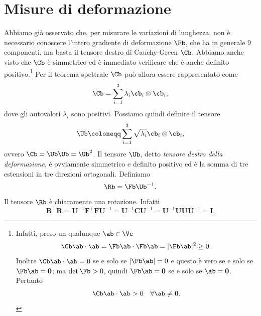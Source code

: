 \section{Misure di deformazione}
Abbiamo già osservato che, per misurare le variazioni di lunghezza, non è necessario conoscere l'intero gradiente di deformazione $\Fb$, che ha in generale 9 componenti, ma basta il tensore  destro di Cauchy-Green $\Cb$. Abbiamo anche visto che $\Cb$ è simmetrico ed è immediato verificare che è anche definito positivo.\footnote{Infatti, preso un qualunque $\ab\in\Vc$
\begin{equation}
\Cb \ab\cdot\ab=\Fb \ab\cdot\Fb\ab=|\Fb\ab|^2\geq 0.
	\end{equation}
Inoltre $\Cb \ab\cdot\ab=0$ se e solo se $|\Fb \ab|=0$ e questo è vero se e solo se $\Fb \ab=\mathbf{0}$; ma $\det \Fb >0$, quindi $\Fb\ab=\mathbf{0}$ se e solo se $\ab=\mathbf{0}$. Pertanto
\begin{equation}
	\Cb \ab\cdot\ab>0 \quad \forall \ab\neq\mathbf{0}.
\end{equation}
}
Per il teorema spettrale $\Cb$ può allora essere rappresentato come
\begin{equation}
\Cb =\sum_{i=1}^3\lambda_i \cb_i\otimes\cb_i,
\end{equation}
dove   gli autovalori $\lambda_i$ sono  positivi. Possiamo quindi definire il tensore
\begin{equation}
\Ub\coloneqq \sum_{i=1}^3\sqrt{\lambda_i }\cb_i\otimes\cb_i,
\end{equation}
ovvero $\Cb=\Ub\Ub=\Ub^2$. Il tensore $\Ub$, detto \textit{tensore destro della deformazione}, è ovviamente simmetrico e definito positivo ed è la somma di tre estensioni in tre direzioni ortogonali. Definiamo
\begin{equation}
\Rb=\Fb\Ub^{-1}.
\end{equation}
Il tensore $\Rb$ è chiaramente una rotazione. Infatti
\begin{equation}
	\mathbf{R}^\top\mathbf{R}=\mathbf{U}^{-1}\mathbf{F}^\top\mathbf{F}\mathbf{U}^{-1}=\mathbf{U}^{-1}\mathbf{C}\mathbf{U}^{-1}=\mathbf{U}^{-1}\mathbf{U}\mathbf{U}\mathbf{U}^{-1}=\mathbf{I}.
\end{equation}

